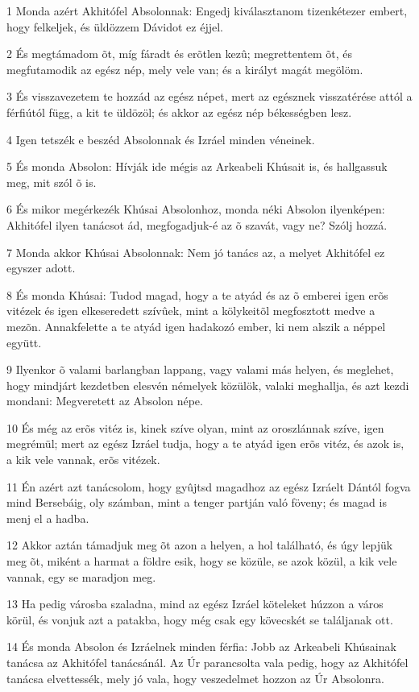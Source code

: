 \par 1 Monda azért Akhitófel Absolonnak: Engedj kiválasztanom tizenkétezer embert, hogy felkeljek, és üldözzem Dávidot ez éjjel.
\par 2 És megtámadom õt, míg fáradt és erõtlen kezû; megrettentem õt, és megfutamodik az egész nép, mely vele van; és a királyt magát megölöm.
\par 3 És visszavezetem te hozzád az egész népet, mert az egésznek visszatérése attól a férfiútól függ, a kit te üldözöl; és akkor az egész nép békességben lesz.
\par 4 Igen tetszék e beszéd Absolonnak és Izráel minden véneinek.
\par 5 És monda Absolon: Hívják ide mégis az Arkeabeli Khúsait is, és hallgassuk meg, mit szól õ is.
\par 6 És mikor megérkezék Khúsai Absolonhoz, monda néki Absolon ilyenképen: Akhitófel ilyen tanácsot ád, megfogadjuk-é az õ szavát, vagy ne? Szólj hozzá.
\par 7 Monda akkor Khúsai Absolonnak: Nem jó tanács az, a melyet Akhitófel ez egyszer adott.
\par 8 És monda Khúsai: Tudod magad, hogy a te atyád és az õ emberei igen erõs vitézek és igen elkeseredett szívûek, mint a kölykeitõl  megfosztott medve a mezõn. Annakfelette a te atyád igen hadakozó ember, ki nem alszik a néppel együtt.
\par 9 Ilyenkor õ valami barlangban lappang, vagy valami más helyen, és meglehet, hogy mindjárt kezdetben elesvén némelyek közülök, valaki meghallja, és azt kezdi mondani: Megveretett az Absolon népe.
\par 10 És még az erõs vitéz is, kinek szíve olyan, mint az oroszlánnak szíve, igen megrémül; mert az egész Izráel tudja, hogy a te atyád igen erõs vitéz, és azok is, a kik vele vannak, erõs vitézek.
\par 11 Én azért azt tanácsolom, hogy gyûjtsd magadhoz az egész Izráelt Dántól fogva mind Bersebáig, oly számban, mint a tenger partján való föveny; és magad is menj el a hadba.
\par 12 Akkor aztán támadjuk meg õt azon a helyen, a hol található, és úgy lepjük meg õt, miként a harmat a földre esik, hogy se közüle, se azok közül, a kik vele vannak, egy se maradjon meg.
\par 13 Ha pedig városba szaladna, mind az egész Izráel köteleket húzzon a város körül, és vonjuk azt a patakba, hogy még csak egy kövecskét se találjanak ott.
\par 14 És monda Absolon és Izráelnek minden férfia: Jobb az Arkeabeli Khúsainak tanácsa az Akhitófel tanácsánál. Az Úr parancsolta vala pedig, hogy az Akhitófel tanácsa elvettessék, mely jó vala, hogy veszedelmet hozzon az Úr Absolonra.
